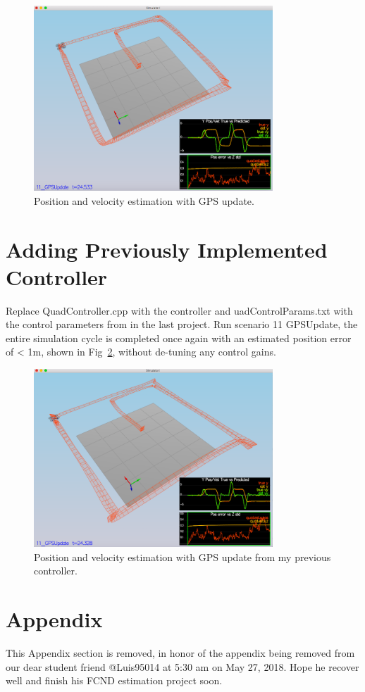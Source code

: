 \documentclass[letterpaper]{article}
\begin{document}
\begin{figure}[ht]
\centering
\includegraphics[width=0.8\textwidth]{./images/scenario11.png}
\caption{\label{fig:GPS_update} Position and velocity estimation with GPS update.}
\end{figure}

\section{Adding Previously Implemented Controller}

Replace QuadController.cpp with the controller and uadControlParams.txt with the control parameters from in the last project. Run scenario 11 GPSUpdate, the entire simulation cycle is completed once again with an estimated position error of < 1m, shown in Fig~\ref{fig:GPS_update2}, without de-tuning any control gains.

\begin{figure}[ht]
\centering
\includegraphics[width=0.8\textwidth]{./images/scenario11_2.png}
\caption{\label{fig:GPS_update2} Position and velocity estimation with GPS update from my previous controller.}
\end{figure}

\clearpage

\section*{Appendix}
This Appendix section is removed, in honor of the appendix being removed from our dear student friend @Luis95014 at 5:30 am on May 27, 2018. Hope he recover well and finish his FCND estimation project soon.
\end{document}
